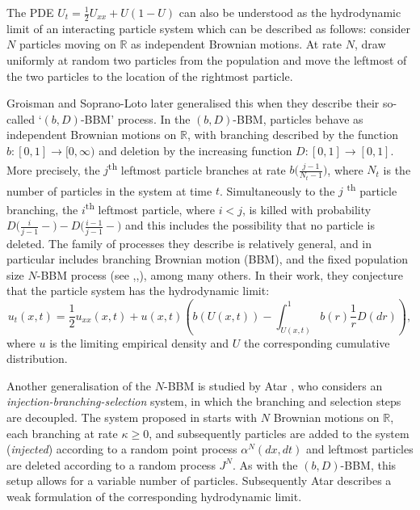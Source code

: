 \documentclass{article}
\newcommand{\B}[1]{\mathbb{#1}}
\begin{document}
The PDE $U_t = \frac12 U_{xx}+ U(1-U)$ can also be understood as the hydrodynamic limit of an interacting particle system \cite{fkppScalingLimit} which can be described as follows: consider $N$ particles moving on $\B{R}$ as independent Brownian motions. At rate $N$, draw uniformly at random two particles from the population and move the leftmost of the two particles to the location of the rightmost particle.

Groisman and Soprano-Loto later generalised this when they describe their so-called `$(b,D)$-BBM' process. In the $(b,D)$-BBM, particles behave as independent Brownian motions on $\B{R}$, with branching described by the function $b:[0,1]\to[0,\infty)$ and deletion by the increasing function $D:[0,1]\to[0,1]$. More precisely, the $j$\textsuperscript{th} leftmost particle branches at rate $b\big(\frac{j-1}{N_t-1}\big)$, where $N_t$ is the number of particles in the system at time $t$. Simultaneously to the $j$ \textsuperscript{th} particle branching, the $i$\textsuperscript{th} leftmost particle, where $i< j$, is killed with probability $D\big(\frac{i}{j-1}-\big)-D\big(\frac{i-1}{j-1}-\big)$ and this includes the possibility that no particle is deleted. The family of processes they describe is relatively general, and in particular includes branching Brownian motion (BBM), and the fixed population size $N$-BBM process (see \cite{toughBeres},\cite{hydroNBBM},\cite{maillard}), among many others. In their work, they conjecture that the particle system has the hydrodynamic limit:
$$u_t(x,t) = \frac12 u_{xx}(x,t) + u(x,t)\left(b(U(x,t))-\int_{U(x,t)}^1 b(r)\frac1r D(dr)\right),$$
where $u$ is the limiting empirical density and $U$ the corresponding cumulative distribution. 

Another generalisation of the $N$-BBM is studied by Atar \cite{atar}, who considers an \textit{injection-branching-selection} system, in which the branching and selection steps are decoupled. The system proposed in \cite{atar} starts with $N$ Brownian motions on $\B{R}$, each branching at rate $\kappa\geq 0$, and subsequently particles are added to the system (\textit{injected}) according to a random point process $\alpha^N(dx,dt)$ and leftmost particles are deleted according to a random  process $J^N$. As with the $(b,D)$-BBM, this setup allows for a variable number of particles. Subsequently Atar describes a weak formulation of the corresponding hydrodynamic limit.
\end{document}
